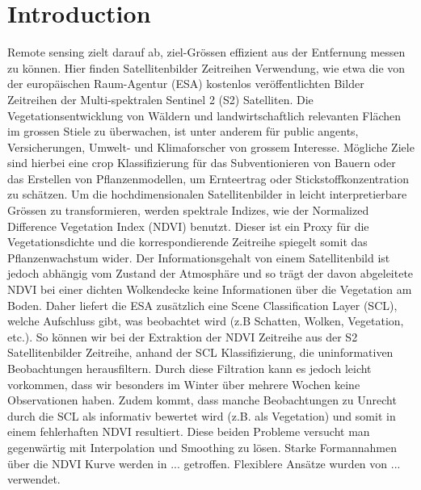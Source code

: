 \chapter{Introduction}

Remote sensing zielt darauf ab, ziel-Grössen effizient aus der Entfernung messen zu können. Hier finden Satellitenbilder Zeitreihen Verwendung, wie etwa die von der europäischen Raum-Agentur (ESA) kostenlos veröffentlichten Bilder Zeitreihen der Multi-spektralen Sentinel 2 (S2) Satelliten.
Die Vegetationsentwicklung von Wäldern und landwirtschaftlich relevanten Flächen im grossen Stiele zu überwachen, ist unter anderem für public angents, Versicherungen, Umwelt- und Klimaforscher von grossem Interesse. Mögliche Ziele sind hierbei eine crop Klassifizierung für das Subventionieren von Bauern oder das Erstellen von Pflanzenmodellen, um Ernteertrag oder Stickstoffkonzentration zu schätzen. 
Um die hochdimensionalen Satellitenbilder in leicht interpretierbare Grössen zu transformieren, werden spektrale Indizes, wie der Normalized Difference Vegetation Index (NDVI) benutzt. Dieser ist ein Proxy für die Vegetationsdichte und die korrespondierende Zeitreihe spiegelt somit das Pflanzenwachstum wider. 
Der Informationsgehalt von einem Satellitenbild ist jedoch abhängig vom Zustand der Atmosphäre und so trägt der davon abgeleitete NDVI bei einer dichten Wolkendecke keine Informationen über die Vegetation am Boden. Daher liefert die ESA zusätzlich eine Scene Classification Layer (SCL), welche Aufschluss gibt, was beobachtet wird (z.B Schatten, Wolken, Vegetation, etc.). So können wir bei der Extraktion der NDVI Zeitreihe aus der S2 Satellitenbilder Zeitreihe, anhand der SCL Klassifizierung, die uninformativen Beobachtungen herausfiltern. Durch diese Filtration kann es jedoch leicht vorkommen, dass wir besonders im Winter über mehrere Wochen keine Observationen haben. Zudem kommt, dass manche Beobachtungen zu Unrecht durch die SCL als informativ bewertet wird (z.B. als Vegetation) und somit in einem fehlerhaften NDVI resultiert. 
Diese beiden Probleme versucht man gegenwärtig mit Interpolation und Smoothing zu lösen. Starke Formannahmen über die NDVI Kurve werden in ... getroffen. Flexiblere Ansätze wurden von ... verwendet. 


